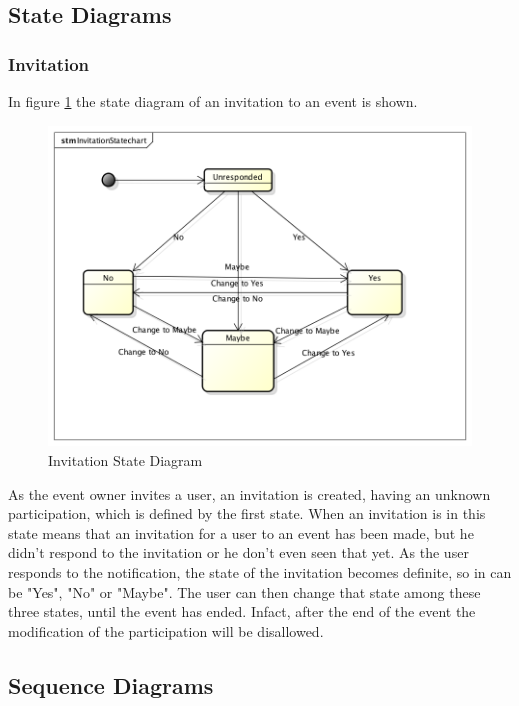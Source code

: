 \subsection{State Diagrams}
\subsubsection{Invitation}
In figure \ref{fig:invstatediagram} the state diagram of an invitation to an event is shown.
 \begin{center}
 \begin{figure}[H]
    \includegraphics[width=1\textwidth ]{../UMLDiagram/InvitationStatechart/InvitationStatechart.png}
    \caption{Invitation State Diagram}
     \label{fig:invstatediagram}
     \end{figure}
   \end{center}
As the event owner invites a user, an invitation is created, having an unknown participation, which is defined by the first state. When an invitation is in this state means that an invitation for a user to an event has been made, but he didn't respond to the invitation or he don't even seen that yet. As the user responds to the notification, the state of the invitation becomes definite, so in can be "Yes", "No" or "Maybe". The user can then change that state among these three states, until the event has ended. Infact, after the end of the event the modification of the participation will be disallowed.
 \subsection{Sequence Diagrams}

